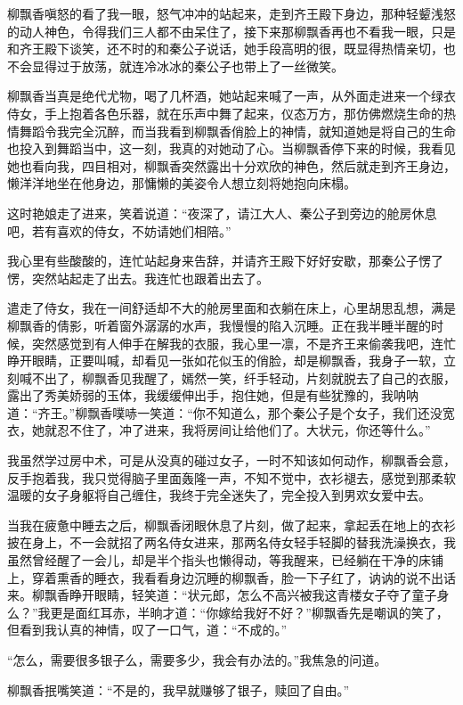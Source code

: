柳飘香嗔怒的看了我一眼，怒气冲冲的站起来，走到齐王殿下身边，那种轻颦浅怒的动人神色，令得我们三人都不由呆住了，接下来那柳飘香再也不看我一眼，只是和齐王殿下谈笑，还不时的和秦公子说话，她手段高明的很，既显得热情亲切，也不会显得过于放荡，就连冷冰冰的秦公子也带上了一丝微笑。

柳飘香当真是绝代尤物，喝了几杯酒，她站起来喊了一声，从外面走进来一个绿衣侍女，手上抱着各色乐器，就在乐声中舞了起来，仪态万方，那仿佛燃烧生命的热情舞蹈令我完全沉醉，而当我看到柳飘香俏脸上的神情，就知道她是将自己的生命也投入到舞蹈当中，这一刻，我真的对她动了心。当柳飘香停下来的时候，我看见她也看向我，四目相对，柳飘香突然露出十分欢欣的神色，然后就走到齐王身边，懒洋洋地坐在他身边，那慵懒的美姿令人想立刻将她抱向床榻。

这时艳娘走了进来，笑着说道：“夜深了，请江大人、秦公子到旁边的舱房休息吧，若有喜欢的侍女，不妨请她们相陪。”

我心里有些酸酸的，连忙站起身来告辞，并请齐王殿下好好安歇，那秦公子愣了愣，突然站起走了出去。我连忙也跟着出去了。

遣走了侍女，我在一间舒适却不大的舱房里面和衣躺在床上，心里胡思乱想，满是柳飘香的倩影，听着窗外潺潺的水声，我慢慢的陷入沉睡。正在我半睡半醒的时候，突然感觉到有人伸手在解我的衣服，我心里一凛，不是齐王来偷袭我吧，连忙睁开眼睛，正要叫喊，却看见一张如花似玉的俏脸，却是柳飘香，我身子一软，立刻喊不出了，柳飘香见我醒了，嫣然一笑，纤手轻动，片刻就脱去了自己的衣服，露出了秀美娇弱的玉体，我缓缓伸出手，抱住她，但是有些犹豫的，我呐呐道：“齐王。”柳飘香噗哧一笑道：“你不知道么，那个秦公子是个女子，我们还没宽衣，她就忍不住了，冲了进来，我将房间让给他们了。大状元，你还等什么。”

我虽然学过房中术，可是从没真的碰过女子，一时不知该如何动作，柳飘香会意，反手抱着我，我只觉得脑子里面轰隆一声，不知不觉中，衣衫褪去，感觉到那柔软温暖的女子身躯将自己缠住，我终于完全迷失了，完全投入到男欢女爱中去。

当我在疲惫中睡去之后，柳飘香闭眼休息了片刻，做了起来，拿起丢在地上的衣衫披在身上，不一会就招了两名侍女进来，那两名侍女轻手轻脚的替我洗澡换衣，我虽然曾经醒了一会儿，却是半个指头也懒得动，等我醒来，已经躺在干净的床铺上，穿着熏香的睡衣，我看看身边沉睡的柳飘香，脸一下子红了，讷讷的说不出话来。柳飘香睁开眼睛，轻笑道：“状元郎，怎么不高兴被我这青楼女子夺了童子身么？”我更是面红耳赤，半晌才道：“你嫁给我好不好？”柳飘香先是嘲讽的笑了，但看到我认真的神情，叹了一口气，道：“不成的。”

“怎么，需要很多银子么，需要多少，我会有办法的。”我焦急的问道。

柳飘香抿嘴笑道：“不是的，我早就赚够了银子，赎回了自由。”

